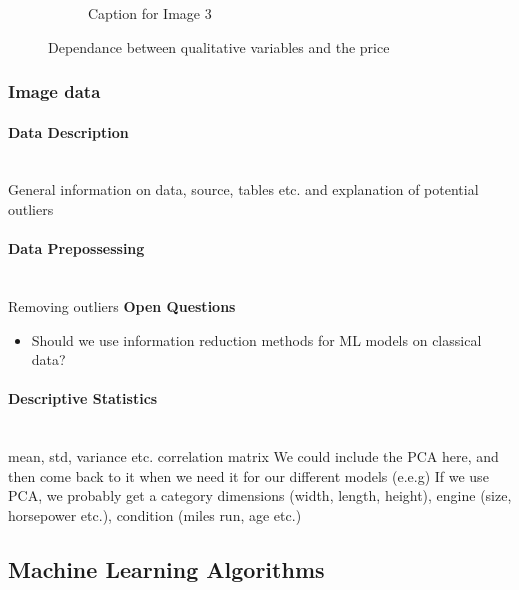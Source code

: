 \documentclass[12pt]{article}
\begin{document}
\begin{figure}[ht]
\begin{subfigure}{0.30\textwidth}
    \caption{Caption for Image 3}
    \label{fig:image3}
  \end{subfigure}
  \caption{Dependance between qualitative variables and the price}
  \label{fig:threeimages}
\end{figure}
\FloatBarrier





\subsubsection{Image data}
\paragraph{Data Description}
~~\\
General information on data, source, tables etc. and explanation of potential outliers
\paragraph{Data Prepossessing}
~~\\
Removing outliers
\noindent \textbf{Open Questions}
\begin{itemize}
    \item Should we use information reduction methods for ML models on classical data?
\end{itemize}
\paragraph{Descriptive Statistics}
~~\\





mean, std, variance etc.
correlation matrix
We could include the PCA here, and then come back to it when we need it for our different models (e.e.g)
If we use PCA, we probably get a category dimensions (width, length, height), engine (size, horsepower etc.), condition (miles run, age etc.)

\subsection{Machine Learning Algorithms}
\end{document}
